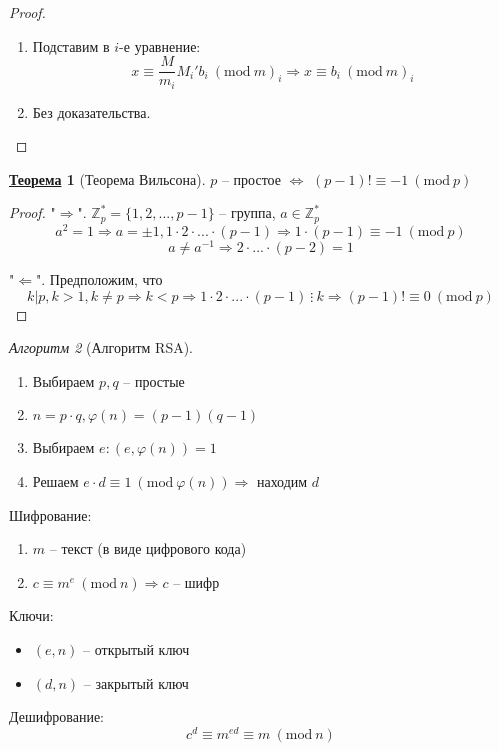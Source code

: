 \documentclass[12pt]{article}
\newenvironment{MyList}[1][4pt]{
  \begin{enumerate}[1.]
  \setlength{\parskip}{0pt}
  \setlength{\itemsep}{#1}
}{       
  \end{enumerate}
}
\newenvironment{MyItemize}[1][4pt]{
  \begin{itemize}
  \setlength{\parskip}{0pt}
  \setlength{\itemsep}{#1}
}{       
  \end{itemize}
}
\def\Z{\mathbb{Z}}       %
\def\SO{\Rightarrow}     %
\def\EQ{\Leftrightarrow} %
\theoremstyle{definition} %
\newtheorem{Thm}{\underline{Теорема}}[subsection] %
\theoremstyle{plain} %
\theoremstyle{remark} %
\newtheorem{Algo}[Thm]{Алгоритм} %
\newcommand{\Mod}[1]{\ (\mathrm{mod}\ #1)}
\begin{document}
{\begin{proof}
    \begin{MyList}
        \item Подставим в $i$-е уравнение: 
        \[x \equiv \frac{M}{m_i} M_i' b_i \Mod m_i \SO x \equiv b_i \Mod m_i\]
        \item Без доказательства.
    \end{MyList}
\end{proof}

\begin{Thm}[Теорема Вильсона]
    $p$ -- простое $\EQ$ $(p - 1)! \equiv -1 \Mod p$  
\end{Thm}

\begin{proof}
    "$\SO$". $\Z_p^* = \{1, 2, ..., p - 1\}$ -- группа, $a \in \Z_p^*$
    \[a^2 = 1 \SO a = \pm 1, 1 \cdot 2 \cdot ... \cdot (p - 1) \SO 1 \cdot (p - 1) \equiv -1 \Mod p\]
    \[a \neq a^{-1} \SO 2 \cdot ... \cdot (p - 2) = 1\]
    
    "$\Leftarrow$". Предположим, что $$k | p, k > 1, k \neq p \SO k < p \SO 1 \cdot 2 \cdot ... \cdot (p - 1) \ \vdots \ k \SO (p - 1)! \equiv 0 \Mod p$$ 
\end{proof}

\begin{Algo}[Алгоритм RSA]
    \begin{MyList}
        \item Выбираем $p, q$ -- простые
        \item $n = p \cdot q, \varphi(n) = (p - 1)(q - 1)$
        \item Выбираем $e : (e, \varphi(n)) = 1$
        \item Решаем $e \cdot d \equiv 1 \Mod {\varphi(n)} \SO$ находим $d$  
    \end{MyList}

    Шифрование:
    \begin{MyList}
        \item $m$ -- текст (в виде цифрового кода)
        \item $c \equiv m^e \Mod n \SO c$ -- шифр
    \end{MyList}

    Ключи:
    \begin{MyItemize}
        \item $(e, n)$ -- открытый ключ
        \item $(d, n)$ -- закрытый ключ
    \end{MyItemize}

    Дешифрование:
    \[c^d \equiv m^{ed} \equiv m \Mod n\]


\end{Algo}}
\end{document}
